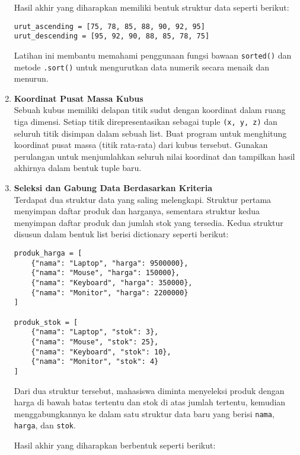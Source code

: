 \begin{enumerate}
Hasil akhir yang diharapkan memiliki bentuk struktur data seperti berikut:

\begin{lstlisting}[style=PythonStyle]
urut_ascending = [75, 78, 85, 88, 90, 92, 95]
urut_descending = [95, 92, 90, 88, 85, 78, 75]
\end{lstlisting}

Latihan ini membantu memahami penggunaan fungsi bawaan \texttt{sorted()} 
dan metode \texttt{.sort()} untuk mengurutkan data numerik secara menaik dan menurun.


  \item \textbf{Koordinat Pusat Massa Kubus} \\
  Sebuah kubus memiliki delapan titik sudut dengan koordinat dalam ruang tiga dimensi. 
  Setiap titik direpresentasikan sebagai tuple \texttt{(x, y, z)} dan seluruh titik disimpan dalam sebuah list.  
  Buat program untuk menghitung koordinat pusat massa (titik rata-rata) dari kubus tersebut.  
  Gunakan perulangan untuk menjumlahkan seluruh nilai koordinat dan tampilkan hasil akhirnya dalam bentuk tuple baru.



  \item \textbf{Seleksi dan Gabung Data Berdasarkan Kriteria} \\
Terdapat dua struktur data yang saling melengkapi. 
Struktur pertama menyimpan daftar produk dan harganya, 
sementara struktur kedua menyimpan daftar produk dan jumlah stok yang tersedia. 
Kedua struktur disusun dalam bentuk list berisi dictionary seperti berikut:

\begin{lstlisting}[style=PythonStyle]
produk_harga = [
    {"nama": "Laptop", "harga": 9500000},
    {"nama": "Mouse", "harga": 150000},
    {"nama": "Keyboard", "harga": 350000},
    {"nama": "Monitor", "harga": 2200000}
]

produk_stok = [
    {"nama": "Laptop", "stok": 3},
    {"nama": "Mouse", "stok": 25},
    {"nama": "Keyboard", "stok": 10},
    {"nama": "Monitor", "stok": 4}
]
\end{lstlisting}

Dari dua struktur tersebut, mahasiswa diminta menyeleksi produk 
dengan harga di bawah batas tertentu dan stok di atas jumlah tertentu, 
kemudian menggabungkannya ke dalam satu struktur data baru yang berisi 
\texttt{nama}, \texttt{harga}, dan \texttt{stok}. 

Hasil akhir yang diharapkan berbentuk seperti berikut:


\end{enumerate}
